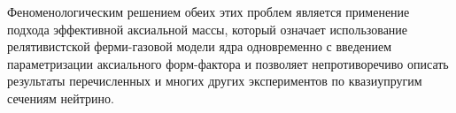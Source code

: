 Феноменологическим решением обеих этих проблем является применение подхода эффективной аксиальной массы, который означает использование релятивистской ферми-газовой модели ядра одновременно с введением параметризации аксиального форм-фактора и позволяет непротиворечиво описать результаты перечисленных и многих других экспериментов по квазиупругим сечениям нейтрино.
